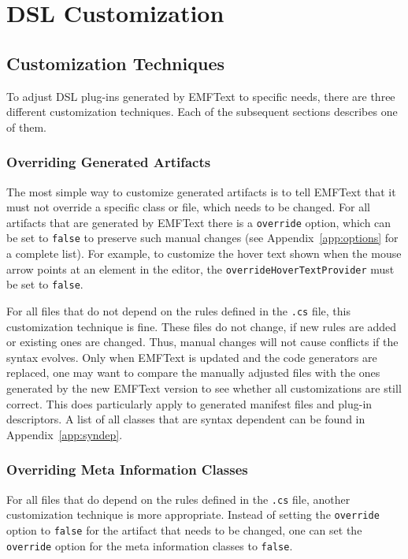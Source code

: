 \chapter{DSL Customization}
\label{chap:customisation}
\section{Customization Techniques}

To adjust DSL plug-ins generated by EMFText to specific needs, there are three
different customization techniques. Each of the subsequent sections describes
one of them.

\subsection{Overriding Generated Artifacts}
\label{sec:overriding_generated_artifacts}

The most simple way to customize generated artifacts is to tell EMFText that it
must not override a specific class or file, which needs to be changed. For
all artifacts that are generated by EMFText there is a \texttt{override} option,
which can be set to \texttt{false} to preserve such manual changes (see
Appendix~\ref{app:options} for a complete list). For example, to customize the
hover text shown when the mouse arrow points at an element in the editor, the 
\texttt{overrideHoverTextProvider} must be set to \texttt{false}.

For all files that do not depend on the rules defined in the \texttt{.cs} file,
this customization technique is fine. These files do not change, if new rules
are added or existing ones are changed. Thus, manual changes will not cause
conflicts if the syntax evolves. Only when EMFText is updated and the code
generators are replaced, one may want to compare the manually adjusted files
with the ones generated by the new EMFText version to see whether all
customizations are still correct. This does particularly apply to generated
manifest files and plug-in descriptors. A list of all classes that are syntax
dependent can be found in Appendix~\ref{app:syndep}.

\subsection{Overriding Meta Information Classes}
\label{sec:overriding_generated_classes}

For all files that do depend on the rules defined in the \texttt{.cs} file,
another customization technique is more appropriate. Instead of setting
the \texttt{override} option to \texttt{false} for the artifact that needs to be
changed, one can set the \texttt{override} option for the meta information
classes to \texttt{false}. 


